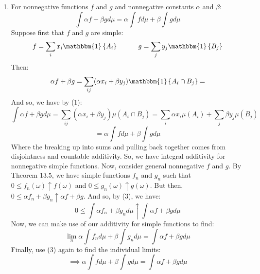 \documentclass[12pt,a4paper]{article}
\newcommand{\1}[1]{\mathbbm{1}\left\{ #1 \right\}}
\begin{document}
\begin{enumerate}
	\\\\
	\textbf{3. $S = \infty$} Then, $v_{i_0}\mu(A_{i_0}) = \infty$ for some $i_0$. Note, no limit, as we only consider finite decompositions of $\Omega$. So, both values are positive in the multiplication, and at least one is infinite. We use this one item in the sum to prove that the limit is infinite as well, which will conclude this part.
	\\\\
	Suppose $0 < x < v_{i_0} \leq \infty$ and $0 < y < \mu(A_{i_0}) \leq \infty$, and put $A_{i_0n} = \left[\omega \in A_{i_0} : f_n(\omega) > x\right]$. As $0 < x < v_{i_0}$, we do have $A_{i_0n} \uparrow A_{i_0}$, for the same reason as in part 1, that $f_n \uparrow f$. Each is measurable via being the intersection of measurable sets. And hence, $\mu(A_{i_0n}) > y$ for $n$ exceeding some $n_0$. This is just the definition of $\uparrow$.
	\\\\
	If we compose $\Omega$ into $A_{i_0n}$ and its complement, we have:
	$$
		\int f_n d\mu \geq x \mu(A_{i_0n}) \geq xy
	$$
	Where the last step is only true for $n \geq n_0$. If $v_{i_0} = \infty$, let $x \to \infty$. If $\mu(A_{i_0}) = \infty$, let $y \to \infty$. In either case it follows that:
	$$
		\lim_n \int f_n d\mu = \infty
	$$
	Thus, for all cases, we have proven: If $0 \leq f_n(\omega) \uparrow f(\omega)$ for all $\omega$, then $0 \leq \int f_n d\mu \uparrow \int f d\mu$.
	
	\item For nonnegative functions $f$ and $g$ and nonnegative constants $\alpha$ and $\beta$:
	$$
		\int \alpha f + \beta g d\mu = \alpha \int f d\mu + \beta \int g d\mu
	$$
	Suppose first that $f$ and $g$ are simple:
	$$
		f = \sum_i x_i \1{A_i} \quad\quad\quad g = \sum_j y_j \1{B_j}
	$$
	Then:
	$$
		\alpha f + \beta g = \sum_{ij} (\alpha x_i + \beta y_j) \1{A_i \cap B_j} =
	$$
	And so, we have by (1):
	$$
		\int \alpha f + \beta g d\mu =
		\sum_{ij} (\alpha x_i + \beta y_j) \mu(A_i \cap B_j) =
		\sum_i \alpha x_i \mu(A_i) +
		\sum_j \beta y_j \mu(B_j)
	$$
	$$
		= \alpha \int f d\mu + \beta \int g d\mu
	$$
	Where the breaking up into sums and pulling back together comes from disjointness and countable additivity. So, we have integral additivity for nonnegative simple functions. Now, consider general nonnegative $f$ and $g$. By Theorem 13.5, we have simple functions $f_n$ and $g_n$ such that $0 \leq f_n(\omega) \uparrow f(\omega)$ and $0 \leq g_n(\omega) \uparrow g(\omega)$. But then, $0 \leq \alpha f_n + \beta g_n \uparrow \alpha f + \beta g$. And so, by (3), we have:
	$$
		0 \leq \int \alpha f_n + \beta g_n d\mu \uparrow \int \alpha f + \beta g d\mu
	$$
	Now, we can make use of our additivity for simple functions to find:
	$$
		\lim_n \alpha \int f_n d\mu + \beta \int g_n d\mu = \int \alpha f + \beta g d\mu
	$$
	Finally, use (3) again to find the individual limits:
	$$
		\implies \alpha \int f d\mu + \beta \int g d\mu = \int \alpha f + \beta g d\mu
	$$
\end{enumerate}
\end{document}
